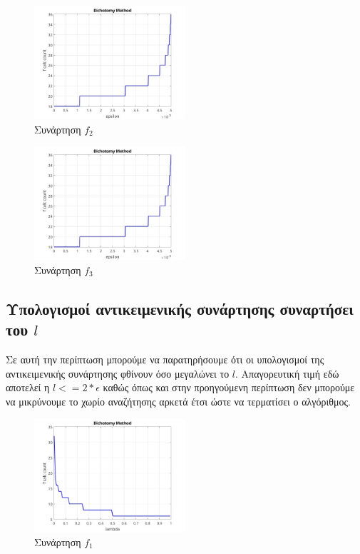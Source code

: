 \begin{figure}[H] %
    \centering
    \includegraphics[width=0.5\textwidth]{media/dichotomyf2_1} %
    \caption{Συνάρτηση $f_2$}
\end{figure}

\begin{figure}[H] %
    \centering
    \includegraphics[width=0.5\textwidth]{media/dichotomyf3_1} %
    \caption{Συνάρτηση $f_3$}
\end{figure}

\subsection{Υπολογισμοί αντικειμενικής συνάρτησης συναρτήσει του $l$}
Σε αυτή την περίπτωση μπορούμε να παρατηρήσουμε ότι οι υπολογισμοί της αντικειμενικής συνάρτησης
φθίνουν όσο μεγαλώνει το $l$. Απαγορευτική τιμή εδώ αποτελεί η $l <= 2*\epsilon$ καθώς
όπως και στην προηγούμενη περίπτωση δεν μπορούμε να μικρύνουμε το χωρίο αναζήτησης αρκετά έτσι ώστε να 
τερματίσει ο αλγόριθμος.

\begin{figure}[H] %
    \centering
    \includegraphics[width=0.5\textwidth]{media/dichotomyf1_2} %
    \caption{Συνάρτηση $f_1$}
\end{figure}

